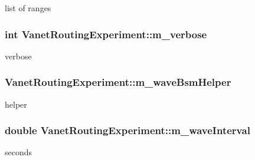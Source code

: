 list of ranges 

\subsubsection[{\texorpdfstring{m\+\_\+verbose}{m_verbose}}]{\setlength{\rightskip}{0pt plus 5cm}int Vanet\+Routing\+Experiment\+::m\+\_\+verbose\hspace{0.3cm}{\ttfamily [private]}}\hypertarget{classVanetRoutingExperiment_a5ac493b7b4acea429be73f407960c7f1}{}\label{classVanetRoutingExperiment_a5ac493b7b4acea429be73f407960c7f1}


verbose 

\subsubsection[{\texorpdfstring{m\+\_\+wave\+Bsm\+Helper}{m_waveBsmHelper}}]{ Vanet\+Routing\+Experiment\+::m\+\_\+wave\+Bsm\+Helper\hspace{0.3cm}{\ttfamily [private]}}\hypertarget{classVanetRoutingExperiment_a690b550804fc4c9bcfab6b8ae40e4728}{}\label{classVanetRoutingExperiment_a690b550804fc4c9bcfab6b8ae40e4728}


helper 

\subsubsection[{\texorpdfstring{m\+\_\+wave\+Interval}{m_waveInterval}}]{\setlength{\rightskip}{0pt plus 5cm}double Vanet\+Routing\+Experiment\+::m\+\_\+wave\+Interval\hspace{0.3cm}{\ttfamily [private]}}\hypertarget{classVanetRoutingExperiment_a273a08aab5e5e9c40b9ce6d51577b640}{}\label{classVanetRoutingExperiment_a273a08aab5e5e9c40b9ce6d51577b640}


seconds 

